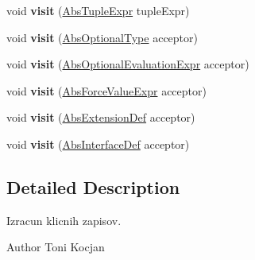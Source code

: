 \begin{DoxyCompactItemize}
\item 
\mbox{\label{classcompiler_1_1frames_1_1_frames_af63e0f67ffcf1426cc8e969eda621468}} 
void {\bfseries visit} (\hyperlink{classcompiler_1_1abstr_1_1tree_1_1expr_1_1_abs_tuple_expr}{Abs\+Tuple\+Expr} tuple\+Expr)
\item 
\mbox{\label{classcompiler_1_1frames_1_1_frames_a1dccc080bbc6eb5ded20e451acc5e833}} 
void {\bfseries visit} (\hyperlink{classcompiler_1_1abstr_1_1tree_1_1type_1_1_abs_optional_type}{Abs\+Optional\+Type} acceptor)
\item 
\mbox{\label{classcompiler_1_1frames_1_1_frames_ab8013f1fa95e78988f25ec8360ada64a}} 
void {\bfseries visit} (\hyperlink{classcompiler_1_1abstr_1_1tree_1_1expr_1_1_abs_optional_evaluation_expr}{Abs\+Optional\+Evaluation\+Expr} acceptor)
\item 
\mbox{\label{classcompiler_1_1frames_1_1_frames_ac82138c0e29061fcdfc5b5b4b4df7445}} 
void {\bfseries visit} (\hyperlink{classcompiler_1_1abstr_1_1tree_1_1expr_1_1_abs_force_value_expr}{Abs\+Force\+Value\+Expr} acceptor)
\item 
\mbox{\label{classcompiler_1_1frames_1_1_frames_a70309dfd126aee4ded6493438816f081}} 
void {\bfseries visit} (\hyperlink{classcompiler_1_1abstr_1_1tree_1_1def_1_1_abs_extension_def}{Abs\+Extension\+Def} acceptor)
\item 
\mbox{\label{classcompiler_1_1frames_1_1_frames_a6e55210e00eb32a5067fce9866a892e0}} 
void {\bfseries visit} (\hyperlink{classcompiler_1_1abstr_1_1tree_1_1def_1_1_abs_interface_def}{Abs\+Interface\+Def} acceptor)
\end{DoxyCompactItemize}


\subsection{Detailed Description}
Izracun klicnih zapisov.

\begin{DoxyAuthor}{Author}
Toni Kocjan 
\end{DoxyAuthor}


